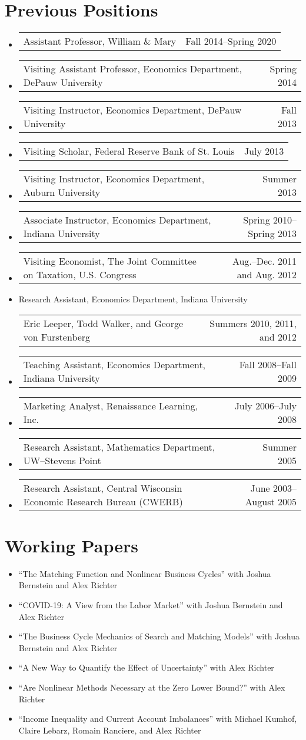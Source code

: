 \documentclass[10pt,letterpaper,en-US]{article}
\makeatletter
\newcommand{\itemrow}[2]
{\begin{tabular*}{\linewidth}{l@{\extracolsep{\fill}}r}
	#1 & #2 \\
\end{tabular*}}
\makeatother
\begin{document}
\section*{Previous Positions}
\begin{itemize}\allowbreak
\item \itemrow{Assistant Professor, William \& Mary}{Fall 2014--Spring 2020}
\item \itemrow{Visiting Assistant Professor, Economics Department, DePauw University}{Spring 2014}
\item \itemrow{Visiting Instructor, Economics Department, DePauw University}{Fall 2013}
\item \itemrow{Visiting Scholar, Federal Reserve Bank of St. Louis}{July 2013}
\item \itemrow{Visiting Instructor, Economics Department, Auburn University}{Summer 2013}
\item \itemrow{Associate Instructor, Economics Department, Indiana University}{Spring 2010--Spring 2013}
\item \itemrow{Visiting Economist, The Joint Committee on Taxation, U.S. Congress}{Aug.--Dec. 2011 and Aug. 2012}
\item Research Assistant, Economics Department, Indiana University\\
        \itemrow{\hspace{.25in}Eric Leeper, Todd Walker, and George von Furstenberg}{Summers 2010, 2011, and 2012}
\item \itemrow{Teaching Assistant, Economics Department, Indiana University}{Fall 2008--Fall 2009}
\item \itemrow{Marketing Analyst, Renaissance Learning, Inc.}{July 2006--July 2008}
\item \itemrow{Research Assistant, Mathematics Department, UW--Stevens Point}{Summer 2005}
\item \itemrow{Research Assistant, Central Wisconsin Economic Research Bureau (CWERB)}{June 2003--August 2005}
\end{itemize}
\newpage

\section*{Working Papers}
\begin{itemize}
\item ``The Matching Function and Nonlinear Business Cycles'' with Joshua Bernstein and Alex Richter
\item ``COVID-19: A View from the Labor Market'' with Joshua Bernstein and Alex Richter
\item ``The Business Cycle Mechanics of Search and Matching Models'' with Joshua Bernstein and Alex Richter
\item ``A New Way to Quantify the Effect of Uncertainty'' with Alex Richter
\item ``Are Nonlinear Methods Necessary at the Zero Lower Bound?'' with Alex Richter
\item ``Income Inequality and Current Account Imbalances'' with Michael Kumhof, Claire Lebarz, Romain Ranciere, and Alex Richter
\end{itemize}
\end{document}
